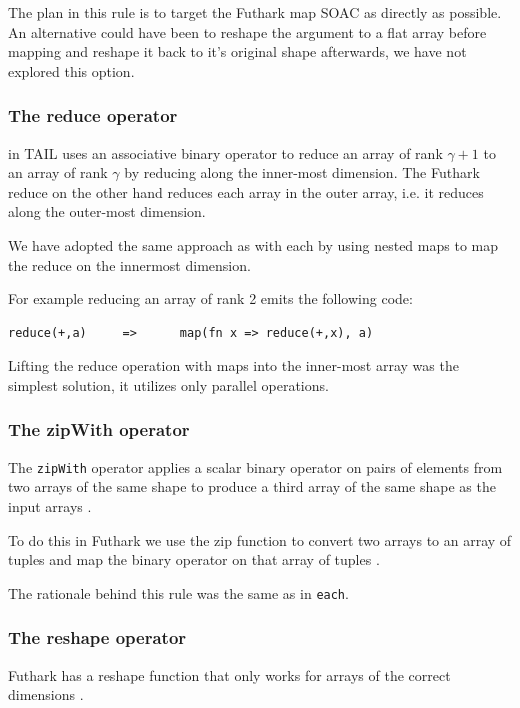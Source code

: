 \documentclass[11pt]{article}
\begin{document}
The plan in this rule is to target the Futhark map SOAC as directly as possible. An alternative could have been to reshape the
argument to a flat array before mapping and reshape it back to it's original shape afterwards, we have not explored this option.

\subsubsection{The reduce operator}

in TAIL uses an associative binary operator to reduce an array of rank
$\gamma+1$ to an array of rank $\gamma$ by reducing along the inner-most dimension\cite{ElsmanDybdal:Array:2014}.
The Futhark reduce on the other hand reduces each array in the outer array, i.e. it reduces along the outer-most dimension\cite{TroelsHenriksen}.
 
We have adopted the same approach as with each by using nested maps to map the reduce on the innermost dimension.
 
For example reducing an array of rank 2 emits the following code:
 
\begin{lstlisting}[numbers=none,frame=none]
reduce(+,a)     =>      map(fn x => reduce(+,x), a)
\end{lstlisting}

Lifting the reduce operation with maps into the inner-most array was the simplest solution, it utilizes only parallel operations.

\subsubsection{The zipWith operator}
The {\tt zipWith} operator applies a scalar binary operator on pairs of elements from two arrays of the same shape to
produce a third array of the same shape as the input arrays \cite{ElsmanDybdal:Array:2014}.
 
To do this in Futhark we use the zip function to convert two arrays to an array of tuples and map the binary operator on that array of tuples \cite{TroelsHenriksen}.

The rationale behind this rule was the same as in {\tt each}.

\subsubsection{The reshape operator} 
Futhark has a reshape function that only works for arrays of the correct dimensions \cite{TroelsHenriksen}.
\end{document}
